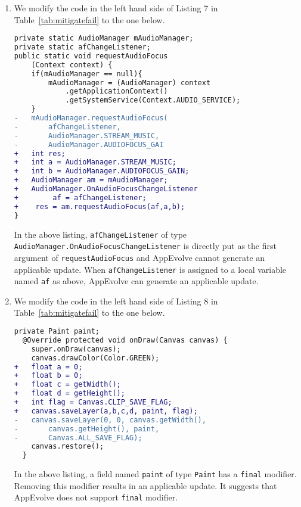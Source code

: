 \begin{enumerate}
\item We modify the code in the left hand side of Listing 7 in Table~\ref{tab:mitigatefail} to the one below.
\begin{lstlisting}[language=diff,numbers=none]
private static AudioManager mAudioManager;
private static afChangeListener;
public static void requestAudioFocus
    (Context context) {
    if(mAudioManager == null){
        mAudioManager = (AudioManager) context
            .getApplicationContext()
            .getSystemService(Context.AUDIO_SERVICE);
    }
-   mAudioManager.requestAudioFocus(
-       afChangeListener,
-       AudioManager.STREAM_MUSIC,
-       AudioManager.AUDIOFOCUS_GAI
+   int res;
+   int a = AudioManager.STREAM_MUSIC;
+   int b = AudioManager.AUDIOFOCUS_GAIN;
+   AudioManager am = mAudioManager;
+   AudioManager.OnAudioFocusChangeListener
+        af = afChangeListener;
+    res = am.requestAudioFocus(af,a,b);
}
\end{lstlisting}
In the above listing, {\tt afChangeListener} of type {\tt AudioManager.OnAudioFocusChangeListener} is directly put as the first argument of {\tt requestAudioFocus} and AppEvolve cannot generate an applicable update. When {\tt afChangeListener} is assigned to a local variable named {\tt af} as above, AppEvolve can generate an applicable update.

\item We modify the code in the left hand side of Listing 8 in Table~\ref{tab:mitigatefail} to the one below.
\begin{lstlisting}[language=diff,numbers=none]
private Paint paint;
  @Override protected void onDraw(Canvas canvas) {
    super.onDraw(canvas);
    canvas.drawColor(Color.GREEN);
+   float a = 0;
+   float b = 0;
+   float c = getWidth();
+   float d = getHeight();
+   int flag = Canvas.CLIP_SAVE_FLAG;
+   canvas.saveLayer(a,b,c,d, paint, flag);
-   canvas.saveLayer(0, 0, canvas.getWidth(),
-       canvas.getHeight(), paint,
-       Canvas.ALL_SAVE_FLAG);
    canvas.restore();
  }
\end{lstlisting}
In the above listing, a field named {\tt paint} of type {\tt Paint} has a {\tt final} modifier. Removing this modifier results in an applicable update. It suggests that AppEvolve does not support {\tt final} modifier.
\end{enumerate}


